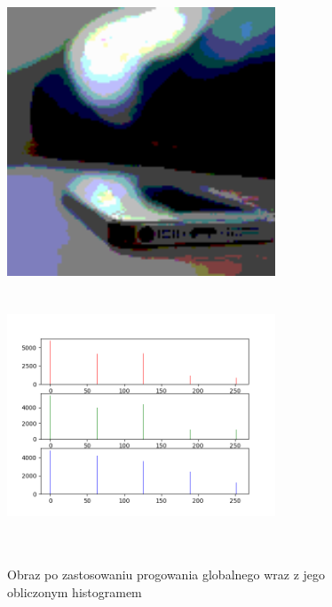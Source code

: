 \documentclass[a4paper,12pt]{book}
\begin{document}
\begin{figure}[H]
	\caption{Obraz po zastosowaniu progowania globalnego wraz z jego obliczonym histogramem}
	\includegraphics[width=8cm, height=8cm]{6-7/multi-global-threshold-image-phone-4.png}
	\includegraphics[width=8cm, height=8cm]{6-7/multi-global-threshold-phone-4.png}
\end{figure}
\end{document}
